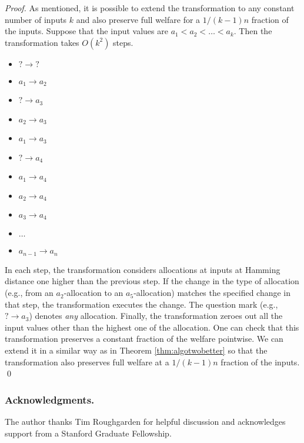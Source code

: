 \documentclass[runningheads,a4paper]{llncs}
\begin{document}
\begin{proof}
As mentioned, it is possible to extend the transformation to any constant number of inputs $k$ and also preserve full welfare for a $1/(k-1)n$ fraction of the inputs. Suppose that the input values are $a_1<a_2<\dots<a_k$. Then the transformation takes $O(k^2)$ steps.
\begin{itemize}
\item $?\rightarrow ?$
\item $a_1\rightarrow a_2$
\item $?\rightarrow a_3$
\item $a_2\rightarrow a_3$
\item $a_1\rightarrow a_3$
\item $?\rightarrow a_4$
\item $a_1\rightarrow a_4$
\item $a_2\rightarrow a_4$
\item $a_3\rightarrow a_4$
\item $\dots$
\item $a_{n-1}\rightarrow a_n$
\end{itemize}

In each step, the transformation considers allocations at inputs at Hamming distance one higher than the previous step. If the change in the type of allocation (e.g., from an $a_2$-allocation to an $a_5$-allocation) matches the specified change in that step, the transformation executes the change. The question mark (e.g., $?\rightarrow a_3$) denotes \emph{any} allocation. Finally, the transformation zeroes out all the input values other than the highest one of the allocation. One can check that this transformation preserves a constant fraction of the welfare pointwise. We can extend it in a similar way as in Theorem \ref{thm:algotwobetter} so that the transformation also preserves full welfare at a $1/(k-1)n$ fraction of the inputs. \qed
\end{proof}

\subsubsection*{Acknowledgments.} The author thanks Tim Roughgarden for helpful discussion and acknowledges support from a Stanford Graduate Fellowship.
\end{document}
